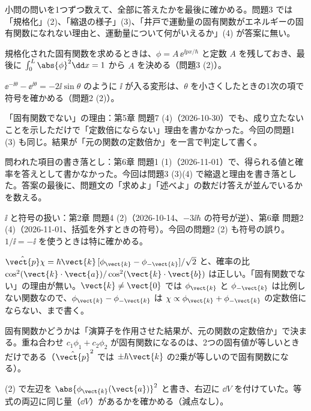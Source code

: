 \begin{daiji}
  \item 小問の問いを1つずつ数えて、全部に答えたかを最後に確かめる。問題3 では「規格化」(2)、「縮退の様子」(3)、「井戸で運動量の固有関数がエネルギーの固有関数になれない理由と、運動量について何がいえるか」(4) が答案に無い。
  \item 規格化された固有関数を求めるときは、$\phi=A\,\ee^{\ii px/\hbar}$ と定数 $A$ を残しておき、最後に $\int_{0}^{L}\abs{\phi}^{2}\dd x=1$ から $A$ を決める（問題3 (2)）。
  \item $\ee^{-\ii\theta}-\ee^{\ii\theta}=-2\ii\sin\theta$ のように $\ii$ が入る変形は、$\theta$ を小さくしたときの1次の項で符号を確かめる（問題2 (2)）。
\end{daiji}
\begin{maemo}
  \item 「固有関数でない」の理由：第5章 問題7 (4)（2026-10-30）でも、成り立たないことを示しただけで「定数倍にならない」理由を書かなかった。今回の問題1 (3) も同じ。結果が「元の関数の定数倍か」を一言で判定して書く。
  \item 問われた項目の書き落とし：第6章 問題1 (1)（2026-11-01）で、得られる値と確率を答えとして書かなかった。今回は問題3 (3)(4) で縮退と理由を書き落とした。答案の最後に、問題文の「求めよ」「述べよ」の数だけ答えが並んでいるかを数える。
  \item $\ii$ と符号の扱い：第2章 問題4 (2)（2026-10-14、$-3\ii\hbar$ の符号が逆）、第6章 問題2 (4)（2026-11-01、括弧を外すときの符号）。今回の問題2 (2) も符号の誤り。$1/\ii=-\ii$ を使うときは特に確かめる。
\end{maemo}
\begin{kotaeran}
   $\hat{\vect{p}}\chi=\hbar\vect{k}\,[\phi_{\vect{k}}-\phi_{-\vect{k}}]/\sqrt{2}$ と、確率の比 $\cos^{2}(\vect{k}\cdot\vect{a})/\cos^{2}(\vect{k}\cdot\vect{b})$ は正しい。「固有関数でない」の理由が無い。$\vect{k}\neq\vect{0}$ では $\phi_{\vect{k}}$ と $\phi_{-\vect{k}}$ は比例しない関数なので、$\phi_{\vect{k}}-\phi_{-\vect{k}}$ は $\chi\propto\phi_{\vect{k}}+\phi_{-\vect{k}}$ の定数倍にならない、まで書く。
\end{kotaeran}
\begin{rikai}
  \item 固有関数かどうかは「演算子を作用させた結果が、元の関数の定数倍か」で決まる。重ね合わせ $c_{1}\phi_{1}+c_{2}\phi_{2}$ が固有関数になるのは、2つの固有値が等しいときだけである（$\hat{\vect{p}}^{2}$ では $\pm\hbar\vect{k}$ の2乗が等しいので固有関数になる）。
  \item (2) で左辺を $\abs{\phi_{\vect{k}}(\vect{a})}^{2}$ と書き、右辺に $\dd V$ を付けていた。等式の両辺に同じ量（$\dd V$）があるかを確かめる（減点なし）。
\end{rikai}
